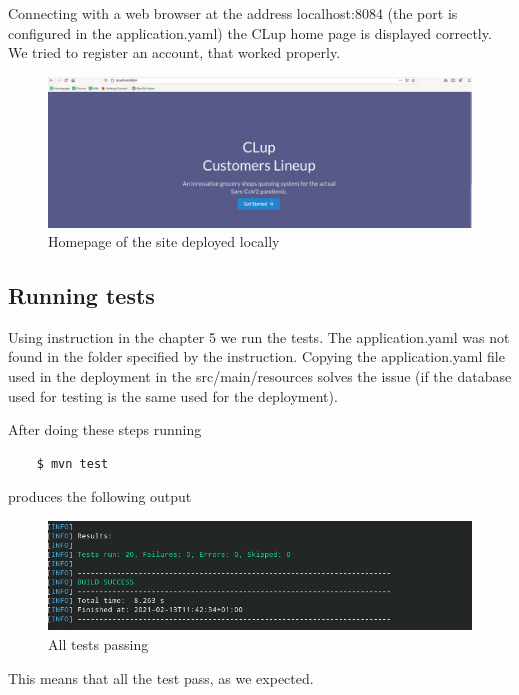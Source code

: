 Connecting with a web browser at the address localhost:8084 (the port is configured in the application.yaml)
the CLup home page is displayed correctly. We tried to register an account, that worked properly.
\begin{figure}[ht]
    \centering
    \includegraphics[width=\textwidth]{Images/deploy.jpg}
    \caption{\label{fig:Booked_Ticket_State}Homepage of the site deployed locally}
\end{figure}

\subsection{Running tests}
Using instruction in the chapter 5 we run the tests.
The application.yaml was not found in the folder specified by the instruction. Copying the application.yaml
file used in the deployment in the src/main/resources solves the issue (if the database used for testing is the
same used for the deployment).

After doing these steps running
\begin{lstlisting}
    $ mvn test
\end{lstlisting}
produces the following output
\begin{figure}[ht]
    \centering
    \includegraphics[width=\textwidth]{Images/test.jpg}
    \caption{\label{fig:Booked_Ticket_State}All tests passing}
\end{figure}
This means that all the test pass, as we expected.


